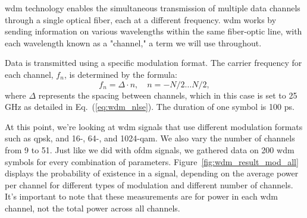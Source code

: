 \Gls{wdm} technology enables the simultaneous transmission of multiple data channels through a single optical fiber, each at a different frequency. \Gls{wdm} works by sending information on various wavelengths within the same fiber-optic line, with each wavelength known as a "channel," a term we will use throughout.

Data is transmitted using a specific modulation format. The carrier frequency for each channel, \(f_n\), is determined by the formula:
\begin{equation}
    f_n = \Delta \cdot n, \quad n = -N/2 \ldots N/2,
\end{equation}
where \( \Delta \) represents the spacing between channels, which in this case is set to 25 GHz as detailed in Eq.~(\ref{eq:wdm_nlse}). The duration of one symbol is 100 ps.


At this point, we're looking at \acrshort{wdm} signals that use different modulation formats such as \acrshort{qpsk}, and 16-, 64-, and 1024-\acrshort{qam}. We also vary the number of channels from 9 to 51. Just like we did with \acrshort{ofdm} signals, we gathered data on 200 \acrshort{wdm} symbols for every combination of parameters. Figure~\ref{fig:wdm_result_mod_all} displays the probability of existence in a signal, depending on the average power per channel for different types of modulation and different number of channels. It's important to note that these measurements are for power in each \acrshort{wdm} channel, not the total power across all channels.

